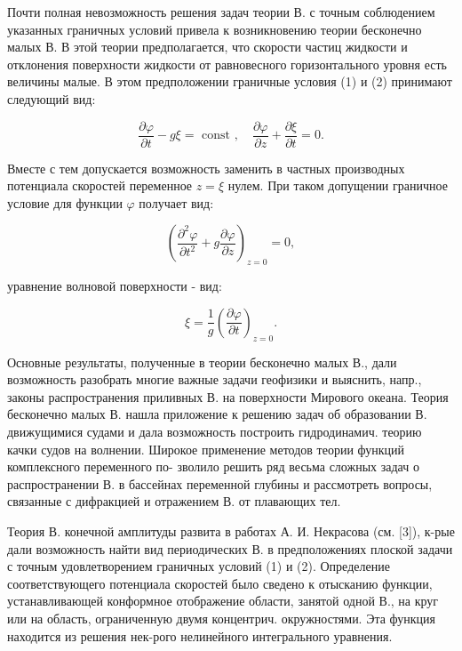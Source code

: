 \documentclass[10pt]{article}
\begin{document}
Почти полная невозможность решения задач теории В. с точным соблюдением указанных граничных условий привела к возникновению теории бесконечно малых В. В этой теории предполагается, что скорости частиц жидкости и отклонения поверхности жидкости от равновесного горизонтального уровня есть величины малые. В этом предположении граничные условия (1) и (2) принимают следующий вид:



\[

\frac{\partial \varphi}{\partial t}-g \xi=\text { const }, \quad \frac{\partial \varphi}{\partial z}+\frac{\partial \xi}{\partial t}=0 .

\]



Вместе с тем допускается возможность заменить в частных производных потенциала скоростей переменное $z=\xi$ нулем. При таком допущении граничное условие для функции $\varphi$ получает вид:



\[

\left(\frac{\partial^{2} \varphi}{\partial t^{2}}+g \frac{\partial \varphi}{\partial z}\right)_{z=0}=0,

\]



уравнение волновой поверхности - вид:



\[

\xi=\frac{1}{g}\left(\frac{\partial \varphi}{\partial t}\right)_{z=0} .

\]



Основные результаты, полученные в теории бесконечно малых В., дали возможность разобрать многие важные задачи геофизики и выяснить, напр., законы распространения приливных В. на поверхности Мирового океана. Теория бесконечно малых В. нашла приложение к решению задач об образовании В. движущимися судами и дала возможность построить гидродинамич. теорию качки судов на волнении. Широкое применение методов теории функций комплексного переменного по- зволило решить ряд весьма сложных задач о распространении В. в бассейнах переменной глубины и рассмотреть вопросы, связанные с дифракцией и отражением В. от плавающих тел.



Теория В. конечной амплитуды развита в работах А. И. Некрасова (см. [3]), к-рые дали возможность найти вид периодических В. в предположениях плоской задачи с точным удовлетворением граничных условий (1) и (2). Определение соответствующего потенциала скоростей было сведено к отысканию функции, устанавливающей конформное отображение области, занятой одной В., на круг или на область, ограниченную двумя концентрич. окружностями. Эта функция находится из решения нек-рого нелинейного интегрального уравнения.
\end{document}
